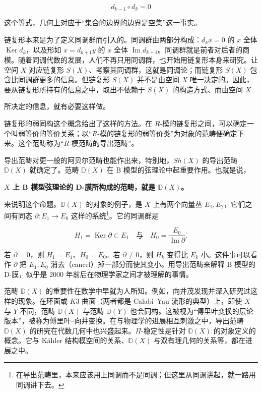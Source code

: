 \[
  d_{k-1}\circ d_k = 0 \tag{1}
\]

这个等式，几何上对应于“集合的边界的边界是空集”这一事实。

链复形本来是为了定义同调群而引入的。同调群由两部分构成：$d_k x = 0$ 的 $x$ 全体 $\operatorname{Ker} d_k$，以及形如 $x = d_{k+1}y$ 的 $x$ 全体 $\operatorname{Im} d_{k+1}$。同调群就是前者对后者的商模。随着同调代数的发展，人们不再只用同调群，也开始用链复形本身来研究。让空间 $X$ 对应链复形 $S(X)$、考察其同调群，这就是同调论；而链复形 $S(X)$ 包含比同调群更多的信息。但链复形 $S(X)$ 并不是由空间 $X$ 唯一决定的。因此，要从链复形所持有的信息之中，取出不依赖于 $S(X)$ 的构造方式、而由空间 $X$

所决定的信息，就有必要这样做。

链复形的弱同构这个概念给出了这样的方法。在 $R$-模的链复形之间，可以确定一个叫弱等价的等价关系；以“$R$-模的链复形的弱等价类”为对象的范畴便确定下来。这个范畴称为“$R$-模范畴的导出范畴”。


导出范畴对更一般的阿贝尔范畴也能作出来，特别地，$Sh(X)$ 的导出范畴 $\mathbb{D}(X)$ 就确定了。范畴 $\mathbb{D}(X)$ 在 B 模型的弦理论中起重要作用。也就是说，

\par\medskip
\noindent\textbf{$X$ 上 B 模型弦理论的 D-膜所构成的范畴，就是 $\mathbb{D}(X)$。}
\par\medskip

来说明这个命题。$\mathbb{D}(X)$ 的对象的例子，是 $X$ 上有两个向量丛 $E_1,E_2$，它们之间有同态 $\partial : E_1 \to E_0$ 这样的系统\footnote{在导出范畴里，本来应该用上同调而不是同调；但这里从同调讲起，就一路用同调讲下去。}。它的同调群是

\[
  H_1 = \operatorname{Ker}\partial \subset E_1
  \quad\text{与}\quad
  H_0 = \frac{E_0}{\operatorname{Im}\partial} .
\]

若 $\partial = 0$，则 $H_1 = E_1$、$H_0 = E_0$。若 $\partial \neq 0$，则 $H_k$ 变得比 $E_k$ 小。这件事可以看作 $\partial$ 把 $E_1,E_0$ 消去（cancel）掉一部分而使其变小。用导出范畴来解释 B 模型的 D-膜，似乎是 2000 年前后在物理学家之间才被理解的事情。


范畴 $\mathbb{D}(X)$ 的重要性在数学中早就为人所知。例如，向井茂发现并深入研究过这样的现象。在环面或 $K3$ 曲面（两者都是 Calabi--Yau 流形的典型）上，即使 $X$ 与 $Y$ 不同，范畴 $\mathbb{D}(X)$ 与范畴 $\mathbb{D}(Y)$ 也会同构。这被视为“傅里叶变换的层论版本”，被称为傅里叶--向井变换。在与物理学的进展相互刺激之中，导出范畴 $\mathbb{D}(X)$ 的研究在代数几何中也兴盛起来。$\Pi$-稳定性是针对 $\mathbb{D}(X)$ 的对象定义的概念。它与 Kähler 结构模空间的关系、$\mathbb{D}(X)$ 与双有理几何的关系等，都在进展之中。

